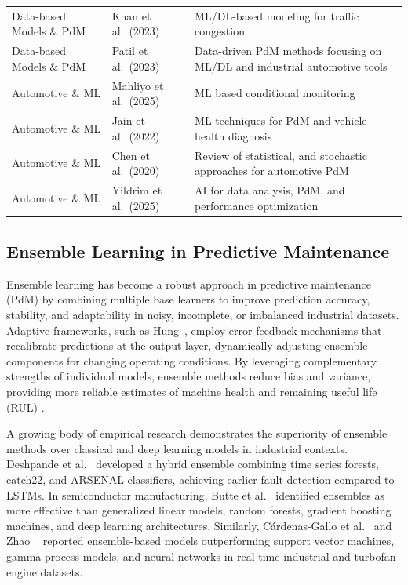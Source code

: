\documentclass[final,5p, twocolumn]{elsarticle}
\begin{document}
\begin{table}[!htb]
\begin{tabular}{p{3cm} p{3.8cm} p{6.5cm}}
Data-based Models \& PdM & Khan et al.~(2023) \cite{khan2023integrating} & ML/DL-based modeling for traffic congestion \\
Data-based Models \& PdM & Patil et al.~(2023) \cite{patil2023intelligent} & Data-driven PdM methods focusing on ML/DL and industrial automotive tools \\
\midrule
Automotive \& ML & Mahliyo et al.~(2025) \cite{mahliyo2025machine} & ML based conditional monitoring \\
Automotive \& ML & Jain et al.~(2022) \cite{jain2022systematic} & ML techniques for PdM and vehicle health diagnosis \\
Automotive \& ML & Chen et al.~(2020) \cite{chen2020deep} & Review of statistical, and stochastic approaches for automotive PdM \\
Automotive \& ML & Yildrim et al.~(2025) \cite{yildirim2025ai} & AI for data analysis, PdM, and performance optimization \\
\bottomrule
\end{tabular}
\end{table}

\subsection{Ensemble Learning in Predictive Maintenance}

Ensemble learning has become a robust approach in predictive maintenance (PdM) by combining multiple base learners to improve prediction accuracy, stability, and adaptability in noisy, incomplete, or imbalanced industrial datasets. Adaptive frameworks, such as Hung~\cite{hung2021improved}, employ error-feedback mechanisms that recalibrate predictions at the output layer, dynamically adjusting ensemble components for changing operating conditions. By leveraging complementary strengths of individual models, ensemble methods reduce bias and variance, providing more reliable estimates of machine health and remaining useful life (RUL) \cite{li2019ensemble}.

A growing body of empirical research demonstrates the superiority of ensemble methods over classical and deep learning models in industrial contexts. Deshpande et al.~\cite{deshpande2022time} developed a hybrid ensemble combining time series forests, catch22, and ARSENAL classifiers, achieving earlier fault detection compared to LSTMs. In semiconductor manufacturing, Butte et al.~\cite{butte2018machine} identified ensembles as more effective than generalized linear models, random forests, gradient boosting machines, and deep learning architectures. Similarly, Cárdenas-Gallo et al.~\cite{cardenas2017ensemble} and Zhao ~\cite{zhao2015ensemble} reported ensemble-based models outperforming support vector machines, gamma process models, and neural networks in real-time industrial and turbofan engine datasets.
\end{document}
